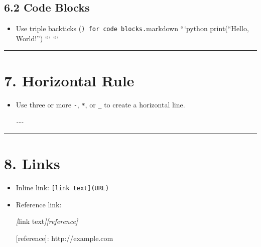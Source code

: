 \documentclass[
]{book}
\newenvironment{Shaded}{\begin{snugshade}}{\end{snugshade}}
\newcommand{\CommentTok}[1]{\textcolor[rgb]{0.56,0.35,0.01}{\textit{#1}}}
\newcommand{\OtherTok}[1]{\textcolor[rgb]{0.56,0.35,0.01}{#1}}
\providecommand{\tightlist}{%
  \setlength{\itemsep}{0pt}\setlength{\parskip}{0pt}}
\theoremstyle{definition}
\theoremstyle{definition}
\theoremstyle{definition}
\theoremstyle{definition}
\theoremstyle{remark}
\begin{document}
\subsection{6.2 Code Blocks}\label{code-blocks}

\begin{itemize}
\tightlist
\item
  Use triple backticks (\texttt{)\ for\ code\ blocks.}markdown
  ```python
  print(``Hello, World!'')
  ```
  ```
\end{itemize}

\begin{center}\rule{0.5\linewidth}{0.5pt}\end{center}

\section{7. Horizontal Rule}\label{horizontal-rule}

\begin{itemize}
\item
  Use three or more \texttt{-}, \texttt{*}, or \texttt{\_} to create a horizontal line.

\begin{Shaded}
\begin{Highlighting}[]
\CommentTok{{-}{-}{-}}
\end{Highlighting}
\end{Shaded}
\end{itemize}

\begin{center}\rule{0.5\linewidth}{0.5pt}\end{center}

\section{8. Links}\label{links}

\begin{itemize}
\item
  Inline link: \texttt{{[}link\ text{]}(URL)}
\item
  Reference link:

\begin{Shaded}
\begin{Highlighting}[]
\CommentTok{[}\OtherTok{link text}\CommentTok{][reference]}

\OtherTok{[reference]: http://example.com}
\end{Highlighting}
\end{Shaded}
\end{itemize}
\end{document}
